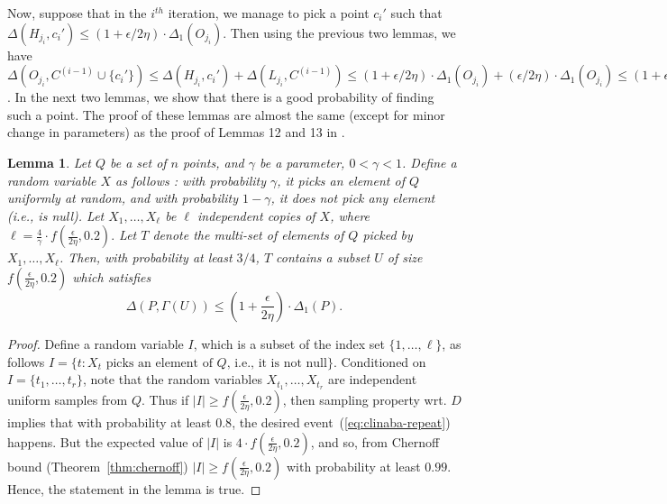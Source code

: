 \documentclass[11pt]{article}
\newtheorem{lemma}{Lemma}
\newcommand{\eps}{{\epsilon}}
\begin{document}
Now, suppose that in the $i^{th}$ iteration, we manage to pick a point $c_i'$ such that 
$\Delta(H_{j_i}, c_i') \leq (1 + \eps/2\eta) \cdot \Delta_1(O_{j_i})$.
Then using the previous two lemmas, we have $\Delta(O_{j_i}, C^{(i-1)} \cup \{c_i'\}) \leq \Delta(H_{j_i}, c_i') + \Delta(L_{j_i}, C^{(i-1)}) \leq (1 + \eps/2\eta) \cdot \Delta_1(O_{j_i}) + (\eps/2\eta) \cdot \Delta_1(O_{j_i}) \leq (1 + \eps/\eta)\cdot \Delta_1(O_{j_i})$. 
In the next two lemmas, we show that there is a good probability of finding such a point.
The proof of these lemmas are almost the same (except for minor change in parameters) as the proof of Lemmas 12 and 13 in \cite{jks12}.


\begin{lemma}
\label{lem:clinaba-repeat}
Let $Q$ be a set of $n$ points, and $\gamma$ be a parameter, $0 < \gamma < 1$. Define a random variable $X$ as follows :
with probability $\gamma$, it picks an element of $Q$ uniformly at random, and with  probability $1-\gamma$, it does not
pick any element (i.e., is null). 
Let $X_1, \ldots, X_\ell$ be $\ell$ independent copies of $X$, where $\ell = \frac{4}{\gamma} \cdot f \left(\frac{\eps}{2 \eta}, 0.2\right).$
Let $T$ denote the multi-set of elements of $Q$ picked by $X_1, \ldots, X_\ell$. Then, with probability at least $3/4$,
$T$ contains a subset $U$ of size $f \left(\frac{\eps}{2 \eta}, 0.2\right)$ which satisfies
\begin{equation}\label{eq:clinaba-repeat}
\Delta(P, \Gamma(U)) \leq \left(1 + \frac{\eps}{2 \eta} \right) \cdot \Delta_1(P).
\end{equation}
\end{lemma}
\begin{proof}
Define a random variable $I$, which is a subset of the index set $\{1, \ldots, \ell\}$, as follows
$I = \{ t : X_t \mbox{ picks an element of $Q$, i.e., it is not null} \}$. 
Conditioned on $I = \{t_1, \ldots, t_r\}$, note that the random variables $X_{t_1}, \ldots, X_{t_r}$ are independent uniform samples from $Q$. 
Thus if $|I| \geq f \left(\frac{\eps}{2 \eta}, 0.2 \right)$, then sampling property wrt. $D$ implies that with probability at least $0.8$, the desired event~(\ref{eq:clinaba-repeat}) happens. 
But the expected value of $|I|$ is $4 \cdot f \left(\frac{\eps}{2 \eta}, 0.2 \right)$, and so, from Chernoff bound (Theorem~\ref{thm:chernoff}) $|I| \geq f \left(\frac{\eps}{2 \eta}, 0.2 \right)$ with probability at least $0.99$. 
Hence, the statement in the lemma is true.
\end{proof}
\end{document}
